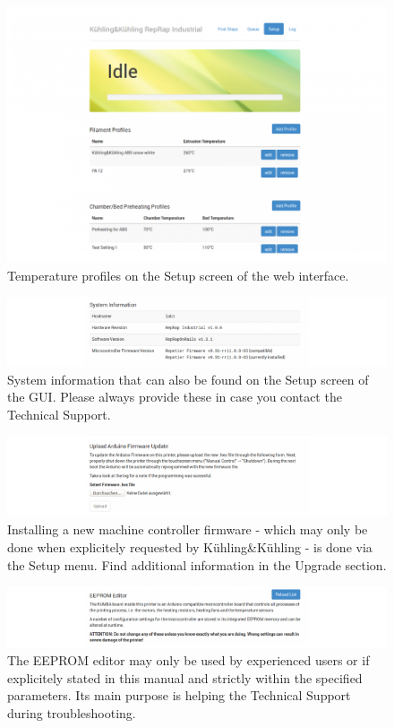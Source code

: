 \begin{figure}[H]
  \centering
  \includegraphics[width=.7\linewidth]{./img/wi_setup_1.png}
  \caption{Temperature profiles on the Setup screen of the web interface.}
\end{figure}

\begin{figure}[H]
  \centering
  \includegraphics[width=.7\linewidth]{./img/wi_setup_11.png}
  \caption{System information that can also be found on the Setup screen of the GUI. 
           Please always provide these in case you contact the Technical Support. }
\end{figure}

\begin{figure}[H]
  \centering
  \includegraphics[width=.7\linewidth]{./img/wi_setup_12.png}
  \caption{Installing a new machine controller firmware - which may only be done when 
           explicitely requested by Kühling\&Kühling - is done via the Setup menu. Find additional information in the Upgrade section.}
\end{figure}

\begin{figure}[H]
  \centering
  \includegraphics[width=.7\linewidth]{./img/wi_setup_13.png}
  \caption{The EEPROM editor may only be used by experienced users or if explicitely 
           stated in this manual and strictly within the specified parameters. Its main purpose is helping the Technical Support during troubleshooting.}
\end{figure}


